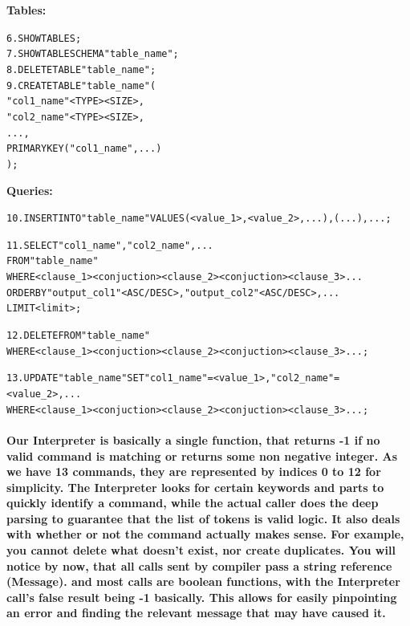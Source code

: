 \documentclass{article}
\begin{document}
\textbf{Tables:}
\begin{alltt}
6. SHOW TABLES;
7. SHOW TABLE SCHEMA "table\_name";
8. DELETE TABLE "table\_name";
9. CREATE TABLE "table\_name" (
    "col1\_name" <TYPE> <SIZE>,
    "col2\_name" <TYPE> <SIZE>,
    ...,
    PRIMARY KEY ("col1\_name",...)
);
\end{alltt}

\textbf{Queries:}
\begin{alltt}
10. INSERT INTO "table\_name" VALUES (<value\_1>, <value\_2>, ...), (...), ... ;

11. SELECT "col1\_name", "col2\_name", ...
FROM "table\_name"
WHERE <clause\_1> <conjuction> <clause\_2> <conjuction> <clause\_3> ... 
ORDERBY "output_col1" <ASC/DESC>, "output_col2" <ASC/DESC>, ... 
LIMIT <limit>;

12. DELETE FROM "table\_name"
WHERE <clause\_1> <conjuction> <clause\_2> <conjuction> <clause\_3> ... ;

13. UPDATE "table\_name" SET "col1\_name" = <value\_1> , "col2\_name" = <value\_2>, ...
WHERE <clause\_1> <conjuction> <clause\_2> <conjuction> <clause\_3> ... ;
\end{alltt}

\paragraph{
    Our Interpreter is basically a single function, that returns -1 if no valid command is matching or returns some non negative integer.
    As we have 13 commands, they are represented by indices 0 to 12 for simplicity. The Interpreter looks for certain keywords and parts to quickly identify a command,
    while the actual caller does the deep parsing to guarantee that the list of tokens is valid logic.
    It also deals with whether or not the command actually makes sense. For example, you cannot delete what doesn't exist, nor create duplicates.
    You will notice by now, that all calls sent by compiler pass a string reference (Message). and most calls are boolean functions, with the Interpreter call's false result being -1 basically.
    This allows for easily pinpointing an error and finding the relevant message that may have caused it. 
} \mbox{} \\
\end{document}
